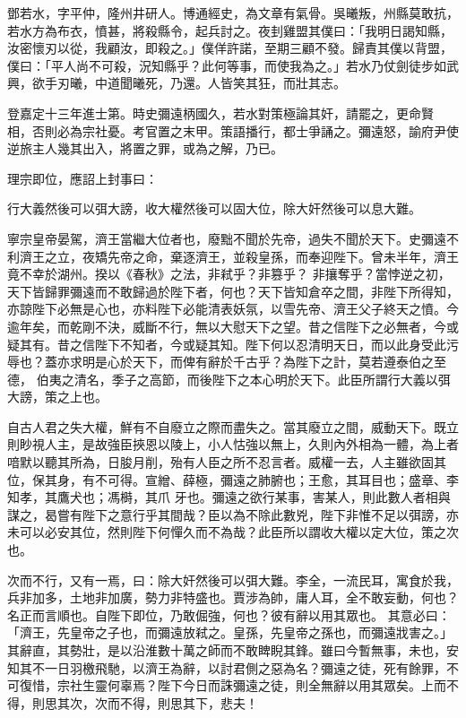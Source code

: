 \begin{pinyinscope}
 鄧若水，字平仲，隆州井研人。博通經史，為文章有氣骨。吳曦叛，州縣莫敢抗，若水方為布衣，憤甚，將殺縣令，起兵討之。夜刲雞盟其僕曰：「我明日謁知縣，汝密懷刃以從，我顧汝，即殺之。」僕佯許諾，至期三顧不發。歸責其僕以背盟，僕曰：「平人尚不可殺，況知縣乎？此何等事，而使我為之。」若水乃仗劍徒步如武興，欲手刃曦，中道聞曦死，乃還。人皆笑其狂，而壯其志。



 登嘉定十三年進士第。時史彌遠柄國久，若水對策極論其奸，請罷之，更命賢
 相，否則必為宗社憂。考官置之末甲。策語播行，都士爭誦之。彌遠怒，諭府尹使逆旅主人幾其出入，將置之罪，或為之解，乃已。



 理宗即位，應詔上封事曰：



 行大義然後可以弭大謗，收大權然後可以固大位，除大奸然後可以息大難。



 寧宗皇帝晏駕，濟王當繼大位者也，廢黜不聞於先帝，過失不聞於天下。史彌遠不利濟王之立，夜矯先帝之命，棄逐濟王，並殺皇孫，而奉迎陛下。曾未半年，濟王竟不幸於湖州。揆以《春秋》之法，非弒乎？非篡乎？
 非攘奪乎？當悖逆之初，天下皆歸罪彌遠而不敢歸過於陛下者，何也？天下皆知倉卒之間，非陛下所得知，亦諒陛下必無是心也，亦料陛下必能清表妖氛，以雪先帝、濟王父子終天之憤。今逾年矣，而乾剛不決，威斷不行，無以大慰天下之望。昔之信陛下之必無者，今或疑其有。昔之信陛下不知者，今或疑其知。陛下何以忍清明天日，而以此身受此污辱也？蓋亦求明是心於天下，而俾有辭於千古乎？為陛下之計，莫若遵泰伯之至德，
 伯夷之清名，季子之高節，而後陛下之本心明於天下。此臣所謂行大義以弭大謗，策之上也。



 自古人君之失大權，鮮有不自廢立之際而盡失之。當其廢立之間，威動天下。既立則眇視人主，是故強臣挾恩以陵上，小人怙強以無上，久則內外相為一體，為上者喑默以聽其所為，日朘月削，殆有人臣之所不忍言者。威權一去，人主雖欲固其位，保其身，有不可得。宣繒、薛極，彌遠之肺腑也；王愈，其耳目也；盛章、李知孝，其鷹犬也；馮榯，其爪
 牙也。彌遠之欲行某事，害某人，則此數人者相與謀之，曷嘗有陛下之意行乎其間哉？臣以為不除此數兇，陛下非惟不足以弭謗，亦未可以必安其位，然則陛下何憚久而不為哉？此臣所以謂收大權以定大位，策之次也。



 次而不行，又有一焉，曰：除大奸然後可以弭大難。李全，一流民耳，寓食於我，兵非加多，土地非加廣，勢力非特盛也。賈涉為帥，庸人耳，全不敢妄動，何也？名正而言順也。自陛下即位，乃敢倔強，何也？彼有辭以用其眾也。
 其意必曰：「濟王，先皇帝之子也，而彌遠放弒之。皇孫，先皇帝之孫也，而彌遠戕害之。」其辭直，其勢壯，是以沿淮數十萬之師而不敢睥睨其鋒。雖曰今暫無事，未也，安知其不一日羽檄飛馳，以濟王為辭，以討君側之惡為名？彌遠之徒，死有餘罪，不可復惜，宗社生靈何辜焉？陛下今日而誅彌遠之徒，則全無辭以用其眾矣。上而不得，則思其次，次而不得，則思其下，悲夫！




\end{pinyinscope}
